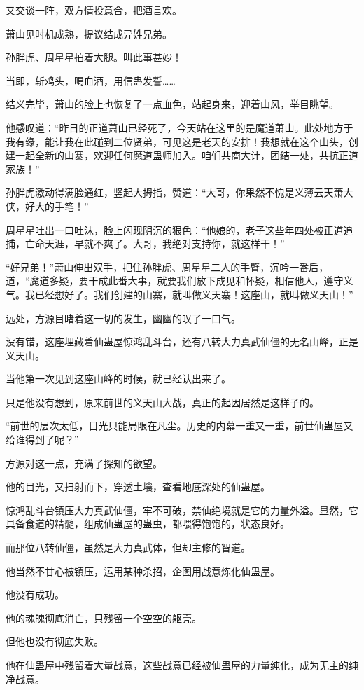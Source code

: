 \begin{this_body}
又交谈一阵，双方情投意合，把酒言欢。

萧山见时机成熟，提议结成异姓兄弟。

孙胖虎、周星星拍着大腿。叫此事甚妙！

当即，斩鸡头，喝血酒，用信蛊发誓……

结义完毕，萧山的脸上也恢复了一点血色，站起身来，迎着山风，举目眺望。

他感叹道：“昨日的正道萧山已经死了，今天站在这里的是魔道萧山。此处地方于我有缘，能让我在此碰到二位贤弟，可见这是老天的安排！我想就在这个山头，创建一起全新的山寨，欢迎任何魔道蛊师加入。咱们共商大计，团结一处，共抗正道家族！”

孙胖虎激动得满脸通红，竖起大拇指，赞道：“大哥，你果然不愧是义薄云天萧大侠，好大的手笔！”

周星星吐出一口吐沫，脸上闪现阴沉的狠色：“他娘的，老子这些年四处被正道追捕，亡命天涯，早就不爽了。大哥，我绝对支持你，就这样干！”

“好兄弟！”萧山伸出双手，把住孙胖虎、周星星二人的手臂，沉吟一番后，道，“魔道多疑，要干成此番大事，就要我们放下成见和怀疑，相信他人，遵守义气。我已经想好了。我们创建的山寨，就叫做义天寨！这座山，就叫做义天山！”

远处，方源目睹着这一切的发生，幽幽的叹了一口气。

没有错，这座埋藏着仙蛊屋惊鸿乱斗台，还有八转大力真武仙僵的无名山峰，正是义天山。

当他第一次见到这座山峰的时候，就已经认出来了。

只是他没有想到，原来前世的义天山大战，真正的起因居然是这样子的。

“前世的层次太低，目光只能局限在凡尘。历史的内幕一重又一重，前世仙蛊屋又给谁得到了呢？”

方源对这一点，充满了探知的欲望。

他的目光，又扫射而下，穿透土壤，查看地底深处的仙蛊屋。

惊鸿乱斗台镇压大力真武仙僵，牢不可破，禁仙绝境就是它的力量外溢。显然，它具备食道的精髓，组成仙蛊屋的蛊虫，都喂得饱饱的，状态良好。

而那位八转仙僵，虽然是大力真武体，但却主修的智道。

他当然不甘心被镇压，运用某种杀招，企图用战意炼化仙蛊屋。

他没有成功。

他的魂魄彻底消亡，只残留一个空空的躯壳。

但他也没有彻底失败。

他在仙蛊屋中残留着大量战意，这些战意已经被仙蛊屋的力量纯化，成为无主的纯净战意。


\end{this_body}
